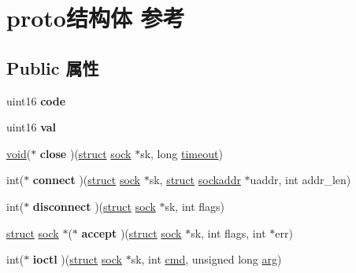\hypertarget{structproto}{}\section{proto结构体 参考}
\label{structproto}
\subsection*{Public 属性}
\begin{DoxyCompactItemize}
\item 
\mbox{\label{structproto_ae6df0a46bfe2842c1abc12f78047002e}} 
uint16 {\bfseries code}
\item 
\mbox{\label{structproto_af7cf33fe20c478a3b46f5ee623b045e3}} 
uint16 {\bfseries val}
\item 
\mbox{\label{structproto_a56834e9d674b18c03629828634a30a55}} 
\hyperlink{interfacevoid}{void}($\ast$ {\bfseries close} )(\hyperlink{interfacestruct}{struct} \hyperlink{structsock}{sock} $\ast$sk, long \hyperlink{structtimeout}{timeout})
\item 
\mbox{\label{structproto_a27051e17e879fff7bc4936fcf356d732}} 
int($\ast$ {\bfseries connect} )(\hyperlink{interfacestruct}{struct} \hyperlink{structsock}{sock} $\ast$sk, \hyperlink{interfacestruct}{struct} \hyperlink{structsockaddr}{sockaddr} $\ast$uaddr, int addr\+\_\+len)
\item 
\mbox{\label{structproto_ae0a67e0977134093d0d9a05a6592217c}} 
int($\ast$ {\bfseries disconnect} )(\hyperlink{interfacestruct}{struct} \hyperlink{structsock}{sock} $\ast$sk, int flags)
\item 
\mbox{\label{structproto_a1a86b48139f3e54fd8e960cb9aebdec9}} 
\hyperlink{interfacestruct}{struct} \hyperlink{structsock}{sock} $\ast$($\ast$ {\bfseries accept} )(\hyperlink{interfacestruct}{struct} \hyperlink{structsock}{sock} $\ast$sk, int flags, int $\ast$err)
\item 
\mbox{\label{structproto_af44a029f1aa3d2cdfc5768c930595bc1}} 
int($\ast$ {\bfseries ioctl} )(\hyperlink{interfacestruct}{struct} \hyperlink{structsock}{sock} $\ast$sk, int \hyperlink{structcmd}{cmd}, unsigned long \hyperlink{interfacevoid}{arg})

\end{DoxyCompactItemize}

